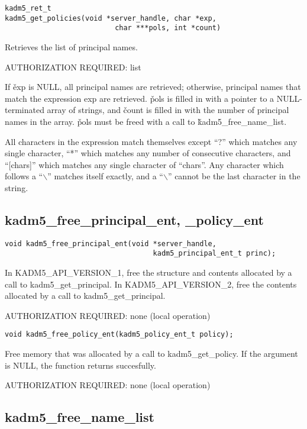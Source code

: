 \begin{verbatim}
kadm5_ret_t
kadm5_get_policies(void *server_handle, char *exp,
                          char ***pols, int *count)
\end{verbatim}

Retrieves the list of principal names.  

AUTHORIZATION REQUIRED: list

If \v{exp} is NULL, all principal names are retrieved; otherwise,
principal names that match the expression exp are retrieved.  \v{pols}
is filled in with a pointer to a NULL-terminated array of strings, and
\v{count} is filled in with the number of principal names in the
array.  \v{pols} must be freed with a call to
\v{kadm5_free_name_list}.

All characters in the expression match themselves except ``?'' which
matches any single character, ``*'' which matches any number of
consecutive characters, and ``[chars]'' which matches any single
character of ``chars''. Any character which follows a ``$\backslash$''
matches itself exactly, and a ``$\backslash$'' cannot be the last
character in the string.

\subsection{kadm5_free_principal_ent, _policy_ent}

\begin{verbatim}
void kadm5_free_principal_ent(void *server_handle,
                                   kadm5_principal_ent_t princ);
\end{verbatim}

In KADM5_API_VERSION_1, free the structure and contents allocated by a
call to kadm5_get_principal.  In KADM5_API_VERSION_2, free the
contents allocated by a call to kadm5_get_principal.

AUTHORIZATION REQUIRED: none (local operation)

\begin{verbatim}
void kadm5_free_policy_ent(kadm5_policy_ent_t policy);
\end{verbatim}

Free memory that was allocated by a call to kadm5_get_policy.  If
the argument is NULL, the function returns succesfully.

AUTHORIZATION REQUIRED: none (local operation)

\subsection{kadm5_free_name_list}

